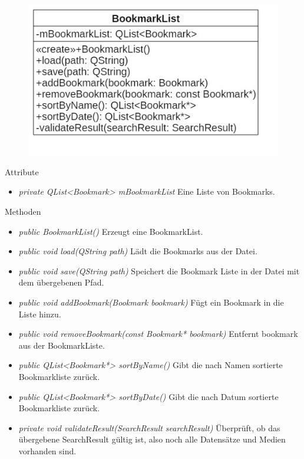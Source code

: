 \begin{figure}[H]
\centering
\includegraphics[scale=0.5]{img/Klassendiagramm/Klassen/Model/BookmarkList}
\label{fig:bookmarkList}
\end{figure}

Attribute
\begin{itemize}
\item\textit{private QList<Bookmark> mBookmarkList} Eine Liste von Bookmarks.
\end{itemize}

Methoden
\begin{itemize}
\item \textit{public BookmarkList()} Erzeugt eine BookmarkList.
\item \textit{public void load(QString path)} Lädt die Bookmarks aus der Datei.
\item \textit{public void save(QString path)} Speichert die Bookmark Liste in der Datei mit dem übergebenen Pfad.
\item \textit{public void addBookmark(Bookmark bookmark)} Fügt ein Bookmark in die Liste hinzu.
\item \textit{public void removeBookmark(const Bookmark* bookmark)} Entfernt bookmark aus der BookmarkListe.
\item \textit{public QList<Bookmark*> sortByName()} Gibt die nach Namen sortierte Bookmarkliste zurück.
\item \textit{public QList<Bookmark*> sortByDate()} Gibt die nach Datum sortierte Bookmarkliste zurück.
\item \textit{private void validateResult(SearchResult searchResult)} Überprüft, ob das übergebene SearchResult gültig ist, also noch alle Datensätze und Medien vorhanden sind.
\end{itemize}

